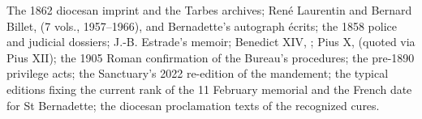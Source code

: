 The 1862 diocesan imprint and the Tarbes archives; Ren\'e
Laurentin and Bernard Billet,  (7 vols., 1957--1966), and Bernadette's autograph
\'ecrits; the 1858 police and judicial dossiers; J.-B. Estrade's
memoir; Benedict XIV, ;
Pius X,  (quoted via Pius XII); the 1905
Roman confirmation of the Bureau's procedures; the pre-1890
privilege acts; the Sanctuary's 2022 re-edition of the
mandement; the typical editions fixing the current rank of the
11 February memorial and the French date for St Bernadette;
the diocesan proclamation texts of the recognized cures.
